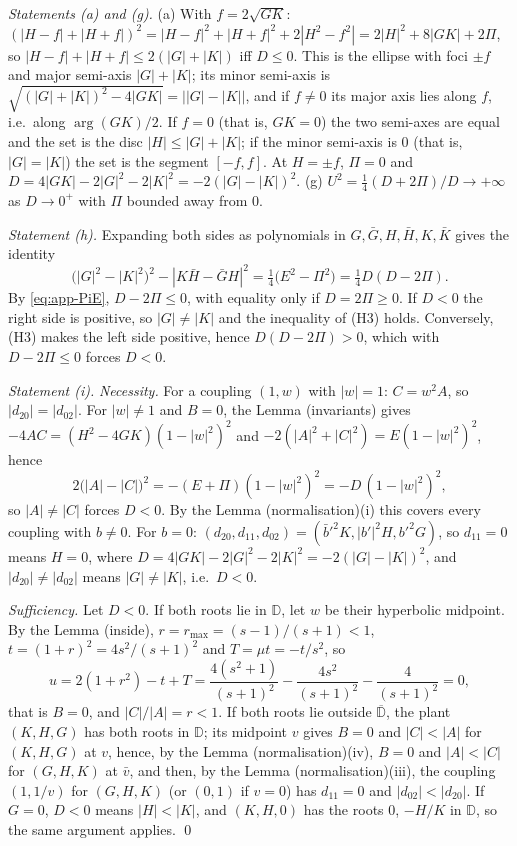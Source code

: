 \documentclass[11pt,reqno]{amsart}
\theoremstyle{plain}
\theoremstyle{definition}
\theoremstyle{remark}
\begin{document}
\medskip\noindent\emph{Statements (a) and (g).}
(a) With $f=2\sqrt{GK}$:
$(|H-f|+|H+f|)^{2}=|H-f|^{2}+|H+f|^{2}+2|H^{2}-f^{2}|=2|H|^{2}+8|GK|+2\Pi$, so
$|H-f|+|H+f|\le2(|G|+|K|)$ iff $D\le0$. This is the ellipse with foci $\pm f$ and major semi-axis
$|G|+|K|$; its minor semi-axis is $\sqrt{(|G|+|K|)^{2}-4|GK|}=\bigl||G|-|K|\bigr|$, and if $f\ne0$ its major axis
lies along $f$, i.e.\ along $\arg(GK)/2$. If $f=0$ (that is, $GK=0$) the two semi-axes are equal and the set is
the disc $|H|\le|G|+|K|$; if the minor semi-axis is $0$ (that is, $|G|=|K|$) the set is the segment $[-f,f]$. At $H=\pm f$, $\Pi=0$ and $D=4|GK|-2|G|^{2}-2|K|^{2}=-2(|G|-|K|)^{2}$.
(g) $U^{2}=\frac14(D+2\Pi)/D\to+\infty$ as $D\to0^{+}$ with $\Pi$ bounded away from $0$.

\medskip\noindent\emph{Statement (h).}
Expanding both sides as polynomials in $G,\bar G,H,\bar H,K,\bar K$ gives the identity
\[
  \bigl(|G|^{2}-|K|^{2}\bigr)^{2}-|K\bar H-\bar GH|^{2}=\tfrac14\bigl(E^{2}-\Pi^{2}\bigr)=\tfrac14D(D-2\Pi).
\]
By \eqref{eq:app-PiE}, $D-2\Pi\le0$, with equality only if $D=2\Pi\ge0$. If $D<0$ the right side is positive,
so $|G|\ne|K|$ and the inequality of (H3) holds. Conversely, (H3) makes the left side positive, hence
$D(D-2\Pi)>0$, which with $D-2\Pi\le0$ forces $D<0$.

\medskip\noindent\emph{Statement (i).}
\emph{Necessity.} For a coupling $(1,w)$ with $|w|=1$: $C=w^{2}A$, so $|d_{20}|=|d_{02}|$. For $|w|\ne1$ and
$B=0$, the Lemma (invariants) gives $-4AC=(H^{2}-4GK)(1-|w|^{2})^{2}$ and $-2(|A|^{2}+|C|^{2})=E(1-|w|^{2})^{2}$,
hence
\[
  2\bigl(|A|-|C|\bigr)^{2}=-(E+\Pi)(1-|w|^{2})^{2}=-D\,(1-|w|^{2})^{2},
\]
so $|A|\ne|C|$ forces $D<0$. By the Lemma (normalisation)(i) this covers every coupling with $b\ne0$. For
$b=0$: $(d_{20},d_{11},d_{02})=(\bar b'^{2}K,|b'|^{2}H,b'^{2}G)$, so $d_{11}=0$ means $H=0$, where
$D=4|GK|-2|G|^{2}-2|K|^{2}=-2(|G|-|K|)^{2}$, and $|d_{20}|\ne|d_{02}|$ means $|G|\ne|K|$, i.e.\ $D<0$.

\emph{Sufficiency.} Let $D<0$. If both roots lie in $\mathbb D$, let $w$ be their hyperbolic midpoint. By
the Lemma (inside), $r=r_{\max}=(s-1)/(s+1)<1$, $t=(1+r)^{2}=4s^{2}/(s+1)^{2}$ and $T=\mu t=-t/s^{2}$, so
\[
  u=2(1+r^{2})-t+T=\frac{4(s^{2}+1)}{(s+1)^{2}}-\frac{4s^{2}}{(s+1)^{2}}-\frac{4}{(s+1)^{2}}=0 ,
\]
that is $B=0$, and $|C|/|A|=r<1$. If both roots lie outside $\overline{\mathbb D}$, the plant $(K,H,G)$ has both
roots in $\mathbb D$; its midpoint $v$ gives $B=0$ and $|C|<|A|$ for $(K,H,G)$ at $v$, hence, by
the Lemma (normalisation)(iv), $B=0$ and $|A|<|C|$ for $(G,H,K)$ at $\bar v$, and then, by
the Lemma (normalisation)(iii), the coupling $(1,1/v)$ for $(G,H,K)$ (or $(0,1)$ if $v=0$) has $d_{11}=0$
and $|d_{02}|<|d_{20}|$. If $G=0$, $D<0$ means $|H|<|K|$, and $(K,H,0)$ has the roots $0$, $-H/K$ in
$\mathbb D$, so the same argument applies. \qed
\end{document}
